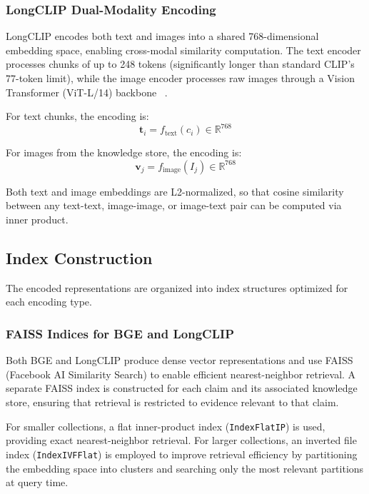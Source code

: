 \subsubsection{LongCLIP Dual-Modality Encoding}

LongCLIP encodes both text and images into a shared 768-dimensional embedding space, enabling cross-modal similarity computation. The text encoder processes chunks of up to 248 tokens (significantly longer than standard CLIP's 77-token limit), while the image encoder processes raw images through a Vision Transformer (ViT-L/14) backbone ~\cite{Zhang2024Mar}.

For text chunks, the encoding is:
\begin{equation}
    \mathbf{t}_i = f_{\text{text}}(c_i) \in \mathbb{R}^{768}
\end{equation}

For images from the knowledge store, the encoding is:
\begin{equation}
    \mathbf{v}_j = f_{\text{image}}(I_j) \in \mathbb{R}^{768}
\end{equation}

Both text and image embeddings are L2-normalized, so that cosine similarity between any text-text, image-image, or image-text pair can be computed via inner product.

\subsection{Index Construction}

The encoded representations are organized into index structures optimized for each encoding type.

\subsubsection{FAISS Indices for BGE and LongCLIP}

Both BGE and LongCLIP produce dense vector representations and use FAISS (Facebook AI Similarity Search) to enable efficient nearest-neighbor retrieval. A separate FAISS index is constructed for each claim and its associated knowledge store, ensuring that retrieval is restricted to evidence relevant to that claim.

For smaller collections, a flat inner-product index (\texttt{IndexFlatIP}) is used, providing exact nearest-neighbor retrieval. For larger collections, an inverted file index (\texttt{IndexIVFFlat}) is employed to improve retrieval efficiency by partitioning the embedding space into clusters and searching only the most relevant partitions at query time.

